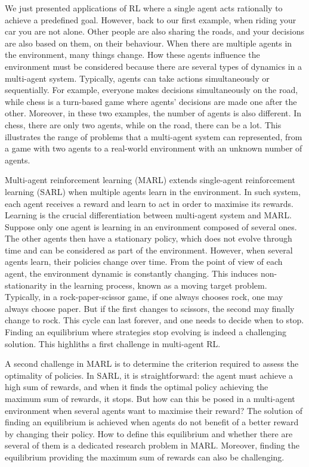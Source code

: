 We just presented applications of RL where a single agent acts rationally to achieve a predefined goal.
However, back to our first example, when riding your car you are not alone.
Other people are also sharing the roads, and your decisions are also based on them, on their behaviour.
When there are multiple agents in the environment, many things change.
How these agents influence the environment must be considered because there are several types of dynamics in a multi-agent system.
Typically, agents can take actions simultaneously or sequentially.
For example, everyone makes decisions simultaneously on the road, while chess is a turn-based game where agents' decisions are made one after the other.
Moreover, in these two examples, the number of agents is also different.
In chess, there are only two agents, while on the road, there can be a lot.
This illustrates the range of problems that a multi-agent system can represented, from a game with two agents to a real-world environment with an unknown number of agents.

Multi-agent reinforcement learning (MARL) extends single-agent reinforcement learning (SARL) when multiple agents learn in the environment.
In such system, each agent receives a reward and learn to act in order to maximise its rewards. 
Learning is the crucial differentiation between multi-agent system and MARL.
Suppose only one agent is learning in an environment composed of several ones.
The other agents then have a stationary policy, which does not evolve through time and can be considered as part of the environment.
However, when several agents learn, their policies change over time.
From the point of view of each agent, the environment dynamic is constantly changing.
This induces non-stationarity in the learning process, known as a moving target problem.
Typically, in a rock-paper-scissor game, if one always chooses rock, one may always choose paper.
But if the first changes to scissors, the second may finally change to rock.
This cycle can last forever, and one needs to decide when to stop.
Finding an equilibrium where strategies stop evolving is indeed a challenging solution.
This highliths a first challenge in multi-agent RL.

A second challenge in MARL is to determine the criterion required to assess the optimality of policies.
In SARL, it is straightforward: the agent must achieve a high sum of rewards, and when it finds the optimal policy achieving the maximum sum of rewards, it stops.
But how can this be posed in a multi-agent environment when several agents want to maximise their reward?
The solution of finding an equilibrium is achieved when agents do not benefit of a better reward by changing their policy.
How to define this equilibrium and whether there are several of them is a dedicated research problem in MARL.
Moreover, finding the equilibrium providing the maximum sum of rewards can also be challenging.

